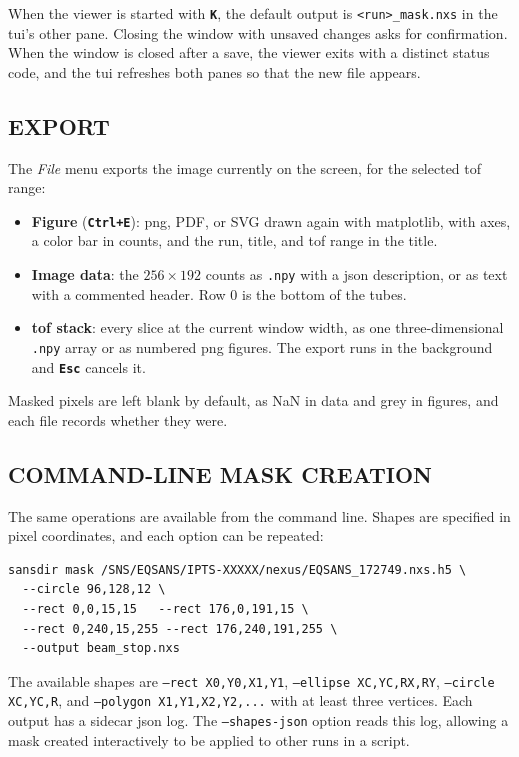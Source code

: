 \documentclass[tm]{ornltm}
\newcommand{\key}[1]{\textbf{\texttt{#1}}}
\begin{document}
When the viewer is started with \key{K}, the default output is
\texttt{<run>\_mask.nxs} in the \ac{tui}'s other pane. Closing the window with
unsaved changes asks for confirmation. When the window is closed after a save,
the viewer exits with a distinct status code, and the \ac{tui} refreshes both
panes so that the new file appears.

\subsection{EXPORT}

The \emph{File} menu exports the image currently on the screen, for the selected
\ac{tof} range:

\begin{itemize}
  \item \textbf{Figure} (\key{Ctrl+E}): \ac{png}, PDF, or SVG drawn again with
    matplotlib, with axes, a color bar in counts, and the run, title, and
    \ac{tof} range in the title.
  \item \textbf{Image data}: the $256\times192$ counts as \texttt{.npy} with a
    \ac{json} description, or as text with a commented header. Row 0 is the
    bottom of the tubes.
  \item \textbf{\ac{tof} stack}: every slice at the current window width, as one
    three-dimensional \texttt{.npy} array or as numbered \ac{png} figures. The
    export runs in the background and \key{Esc} cancels it.
\end{itemize}

Masked pixels are left blank by default, as NaN in data and grey in figures,
and each file records whether they were.

\subsection{COMMAND-LINE MASK CREATION}
\label{sec:maskcli}

The same operations are available from the command line. Shapes are specified in
pixel coordinates, and each option can be repeated:

\begin{lstlisting}[language=shellsession]
sansdir mask /SNS/EQSANS/IPTS-XXXXX/nexus/EQSANS_172749.nxs.h5 \
  --circle 96,128,12 \
  --rect 0,0,15,15   --rect 176,0,191,15 \
  --rect 0,240,15,255 --rect 176,240,191,255 \
  --output beam_stop.nxs
\end{lstlisting}

The available shapes are \texttt{--rect X0,Y0,X1,Y1}, \texttt{--ellipse
XC,YC,RX,RY}, \texttt{--circle XC,YC,R}, and \texttt{--polygon
X1,Y1,X2,Y2,...} with at least three vertices. Each output has a sidecar
\ac{json} log. The \texttt{--shapes-json} option reads this log, allowing a mask
created interactively to be applied to other runs in a script.
\end{document}
